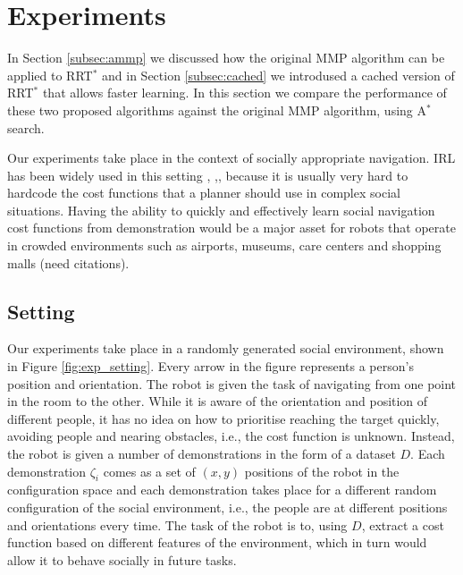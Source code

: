 \documentclass{article}  %
\begin{document}





\section{Experiments}
	In Section \ref{subsec:ammp} we discussed how the original MMP algorithm can be applied to RRT$^*$ and in Section \ref{subsec:cached} we introdused a cached version of RRT$^*$ that allows faster learning. In this section we compare the performance of these two proposed algorithms against the original MMP algorithm, using A$^*$ search.
	
	Our experiments take place in the context of socially appropriate navigation. IRL has been widely used in this setting \cite{okallearning}, \cite{henry2010learning},\cite{vasquez2014inverse}, because it is usually very hard to hardcode the cost functions that a planner should use in complex social situations. Having the ability to quickly and effectively learn social navigation cost functions from demonstration would be a major asset for robots that operate in crowded environments such as airports, museums, care centers and shopping malls (need citations). 
	\subsection{Setting}
	Our experiments take place in a randomly generated social environment, shown in Figure \ref{fig:exp_setting}. Every arrow in the figure represents a person's position and orientation. The robot is given the task of navigating from one point in the room to the other. While it is aware of the orientation and position of different people, it has no idea on how to prioritise reaching the target quickly, avoiding people and nearing obstacles, i.e., the cost function is unknown. Instead, the robot is given a number of demonstrations in the form of a dataset $D$. Each demonstration $\zeta_i$ comes as a set of $(x,y)$ positions of the robot in the configuration space and each demonstration takes place for a different random configuration of the social environment, i.e., the people are at different positions and orientations every time. The task of the robot is to, using $D$, extract a cost function based on different features of the environment, which in turn would allow it to behave socially in future tasks.
\end{document}

